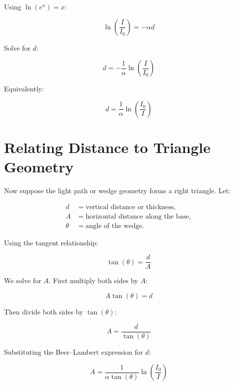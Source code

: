 \documentclass{article}
\begin{document}
Using \(\ln(e^x)=x\):

\begin{equation}
\ln\left(\frac{I}{I_0}\right) = -\alpha d
\end{equation}

Solve for \(d\):

\begin{equation}
d = -\frac{1}{\alpha}\ln\left(\frac{I}{I_0}\right)
\end{equation}

Equivalently:

\begin{equation}
d = \frac{1}{\alpha}\ln\left(\frac{I_0}{I}\right)
\end{equation}

\section*{Relating Distance to Triangle Geometry}

Now suppose the light path or wedge geometry forms a right triangle. Let:

\begin{align*}
d &= \text{vertical distance or thickness}, \\
A &= \text{horizontal distance along the base}, \\
\theta &= \text{angle of the wedge}.
\end{align*}

Using the tangent relationship:

\begin{equation}
\tan(\theta) = \frac{d}{A}
\end{equation}

We solve for \(A\). First multiply both sides by \(A\):

\begin{equation}
A\tan(\theta) = d
\end{equation}

Then divide both sides by \(\tan(\theta)\):

\begin{equation}
A = \frac{d}{\tan(\theta)}
\end{equation}

Substituting the Beer--Lambert expression for \(d\):

\begin{equation}
A = \frac{1}{\alpha \tan(\theta)}
\ln\left(\frac{I_0}{I}\right)
\end{equation}
\end{document}
